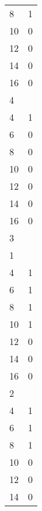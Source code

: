 \documentclass{article}
\begin{document}
\begin{table}[]
\begin{tabular}{ll}
8                                          & 1 \\
10                                         & 0 \\
12                                         & 0 \\
14                                         & 0 \\
16                                         & 0 \\
4                                          &   \\
4                                          & 1 \\
6                                          & 0 \\
8                                          & 0 \\
10                                         & 0 \\
12                                         & 0 \\
14                                         & 0 \\
16                                         & 0 \\
3                                          &   \\
1                                          &   \\
4                                          & 1 \\
6                                          & 1 \\
8                                          & 1 \\
10                                         & 1 \\
12                                         & 0 \\
14                                         & 0 \\
16                                         & 0 \\
2                                          &   \\
4                                          & 1 \\
6                                          & 1 \\
8                                          & 1 \\
10                                         & 0 \\
12                                         & 0 \\
14                                         & 0 \\

\end{tabular}
\end{table}
\end{document}

